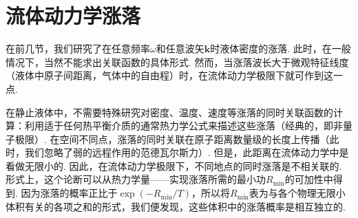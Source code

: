 \section{流体动力学涨落}

在前几节，我们研究了在任意频率$\omega$和任意波矢$\bm{k}$时液体密度的涨落. 此时，在一般情况下，当然不能求出关联函数的具体形式. 然而，当涨落波长大于微观特征线度（液体中原子间距离，气体中的自由程）时，在流体动力学极限下就可作到这一点.

在静止液体中，不需要特殊研究对密度、温度、速度等涨落的同时关联函数的计算：利用适于任何热平衡介质的通常热力学公式来描述这些涨落（经典的，即非量子极限）. 在空间不同点，涨落的同时关联在原子距离数量级的长度上传播（此时，我们忽略了弱的远程作用的范德瓦尔斯力）. 但是，此距离在流体动力学中是看做无限小的. 因此，在流体动力学极限下，不同地点的同时涨落是不相关联的. 形式上，这个论断可以从热力学量——实现涨落所需的最小功$R_{\mathrm{min}}$的可加性中得到. 因为涨落的概率正比于$\exp(-R_{\mathrm{min}}/T)$，所以将$R_{\mathrm{min}}$表为与各个物理无限小体积有关的各项之和的形式，我们便发现，这些体积中的涨落概率是相互独立的.

